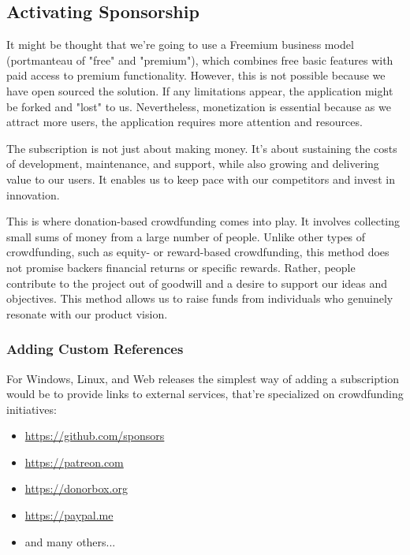 
\subsection{Activating Sponsorship}

It might be thought that we're going to use a Freemium business model (portmanteau of "free" and "premium"), which 
combines free basic features with paid access to premium functionality. However, this is not possible because we have 
open sourced the solution. If any limitations appear, the application might be forked and "lost" to us. Nevertheless, 
monetization is essential because as we attract more users, the application requires more attention and resources.

The subscription is not just about making money. It's about sustaining the costs of development, maintenance, and 
support, while also growing and delivering value to our users. It enables us to keep pace with our competitors and 
invest in innovation.

This is where donation-based crowdfunding comes into play. It involves collecting small sums of money from a large 
number of people. Unlike other types of crowdfunding, such as equity- or reward-based crowdfunding, this method does not 
promise backers financial returns or specific rewards. Rather, people contribute to the project out of goodwill and a 
desire to support our ideas and objectives. This method allows us to raise funds from individuals who genuinely resonate 
with our product vision.


\subsubsection{Adding Custom References}

For Windows, Linux, and Web releases the simplest way of adding a subscription would be to provide links to external 
services, that're specialized on crowdfunding initiatives:

\begin{itemize}
  \item  \href{https://github.com/sponsors}{https://github.com/sponsors}
  \item  \href{https://patreon.com}{https://patreon.com}
  \item  \href{https://donorbox.org}{https://donorbox.org}
  \item  \href{https://paypal.me}{https://paypal.me}
  \item  and many others...
\end{itemize}

